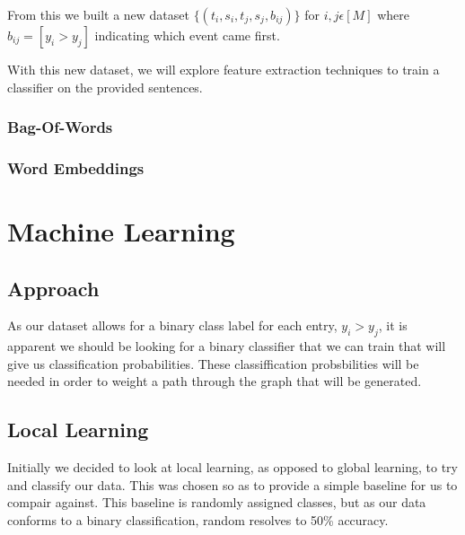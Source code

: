 \documentclass[12pt]{report}
\begin{document}
                From this we built a new dataset $\{(t_{i},s_{i},t_{j},s_{j},b_{ij})\}$ for $i,j \epsilon [M]$
                where $b_{ij} = [y_{i} > y_{j}]$ indicating which event came first.

                With this new dataset, we will explore feature extraction techniques to train a classifier
                on the provided sentences.
                
                \subsection{Bag-Of-Words}
                \subsection{Word Embeddings}

\chapter{Machine Learning}

\section{Approach}
As our dataset allows for a binary class label for each entry,
$y_{i} > y_{j}$, it is apparent we should be looking for a binary classifier that we can train
that will give us classification probabilities. These classiffication probsbilities
will be needed in order to weight a path through the graph that will be generated.
\section{Local Learning}
Initially we decided to look at local learning, as opposed to global learning,
to try and classify our data. This was chosen so as to provide a
simple baseline for us to compair against. This baseline is
randomly assigned classes, but as our data conforms to a
binary classification, random resolves to 50\% accuracy.
\end{document}
